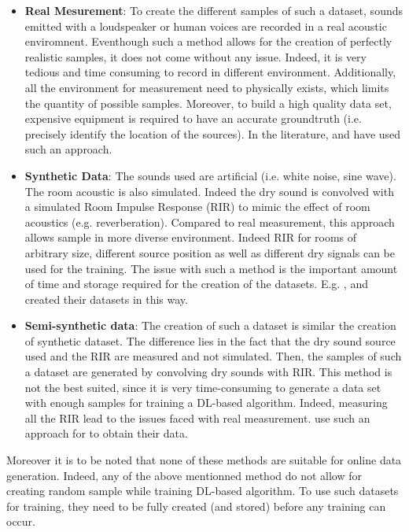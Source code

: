 \documentclass{article}
\begin{document}
\begin{itemize}
    \item \textbf{Real Mesurement}: To create the different samples of such a dataset, sounds emitted with a loudspeaker or human voices are recorded in a real acoustic enviromnent. Eventhough such a method allows for the creation of perfectly realistic samples, it does not come without any issue. Indeed, it is very tedious and time consuming to record in different environment. Additionally, all the environment for measurement need to physically exists, which limits the quantity of possible samples. Moreover, to build a high quality data set, expensive equipment is required to have an accurate groundtruth (i.e. precisely identify the location of the sources). In the literature, \cite{he2018deep} and \cite{ferguson2018sound} have used such an approach.
    \item \textbf{Synthetic Data}: The sounds used are artificial (i.e. white noise, sine wave). The room acoustic is also simulated. Indeed the dry sound is convolved with a simulated Room Impulse Response (RIR) to mimic the effect of room acoustics (e.g. reverberation). Compared to real measurement, this approach allows sample in more diverse environment. Indeed RIR for rooms of arbitrary size, different source position as well as different dry signals can be used for the training. The issue with such a method is the important amount of time and storage required for the creation of the datasets. E.g. \cite{chakrabarty2017broadband}, \cite{perotin2018crnn} and \cite{adavanne2018direction} created their datasets in this way.
    \item \textbf{Semi-synthetic data}: The creation of such a dataset is similar the creation of synthetic dataset. The difference lies in the fact that the dry sound source used and the RIR are measured and not simulated. Then, the samples of such a dataset are generated by convolving dry sounds with RIR. This method is not the best suited, since it is very time-consuming to generate a data set with enough samples for training a DL-based algorithm. Indeed, measuring all the RIR lead to the issues faced with real measurement. \cite{takeda2016sound} use such an approach for to obtain their data.
\end{itemize}

Moreover it is to be noted that none of these methods are suitable for online data generation. Indeed, any of the above mentionned method do not allow for creating random sample while training DL-based algorithm. To use such datasets for training, they need to be fully created (and stored) before any training can occur. 
\end{document}
